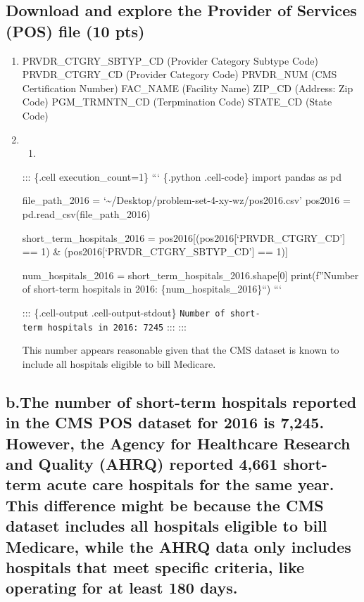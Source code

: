 \documentclass[
  letterpaper,
  DIV=11,
  numbers=noendperiod]{scrartcl}
\providecommand{\tightlist}{%
  \setlength{\itemsep}{0pt}\setlength{\parskip}{0pt}}\usepackage{longtable,booktabs,array}
\begin{document}
\subsection{Download and explore the Provider of Services (POS) file (10
pts)}\label{download-and-explore-the-provider-of-services-pos-file-10-pts}

\begin{enumerate}
\def\labelenumi{\arabic{enumi}.}
\item
  PRVDR\_CTGRY\_SBTYP\_CD (Provider Category Subtype Code)
  PRVDR\_CTGRY\_CD (Provider Category Code) PRVDR\_NUM (CMS
  Certification Number) FAC\_NAME (Facility Name) ZIP\_CD (Address: Zip
  Code) PGM\_TRMNTN\_CD (Terpmination Code) STATE\_CD (State Code)
\item
  \begin{enumerate}
  \def\labelenumii{\alph{enumii}.}
  \tightlist
  \item
  \end{enumerate}

  ::: \{.cell execution\_count=1\} ``` \{.python .cell-code\} import
  pandas as pd

  file\_path\_2016 =
  `\textasciitilde/Desktop/problem-set-4-xy-wz/pos2016.csv' pos2016 =
  pd.read\_csv(file\_path\_2016)

  short\_term\_hospitals\_2016 =
  pos2016{[}(pos2016{[}`PRVDR\_CTGRY\_CD'{]} == 1) \&
  (pos2016{[}`PRVDR\_CTGRY\_SBTYP\_CD'{]} == 1){]}

  num\_hospitals\_2016 = short\_term\_hospitals\_2016.shape{[}0{]}
  print(f''Number of short-term hospitals in 2016:
  \{num\_hospitals\_2016\}``) ```

  ::: \{.cell-output .cell-output-stdout\}
  \texttt{Number\ of\ short-term\ hospitals\ in\ 2016:\ 7245} ::: :::

  This number appears reasonable given that the CMS dataset is known to
  include all hospitals eligible to bill Medicare.
\end{enumerate}

\subsection{b.The number of short-term hospitals reported in the CMS POS
dataset for 2016 is 7,245. However, the Agency for Healthcare Research
and Quality (AHRQ) reported 4,661 short-term acute care hospitals for
the same year. This difference might be because the CMS dataset includes
all hospitals eligible to bill Medicare, while the AHRQ data only
includes hospitals that meet specific criteria, like operating for at
least 180
days.}\label{b.the-number-of-short-term-hospitals-reported-in-the-cms-pos-dataset-for-2016-is-7245.-however-the-agency-for-healthcare-research-and-quality-ahrq-reported-4661-short-term-acute-care-hospitals-for-the-same-year.-this-difference-might-be-because-the-cms-dataset-includes-all-hospitals-eligible-to-bill-medicare-while-the-ahrq-data-only-includes-hospitals-that-meet-specific-criteria-like-operating-for-at-least-180-days.}
\end{document}
